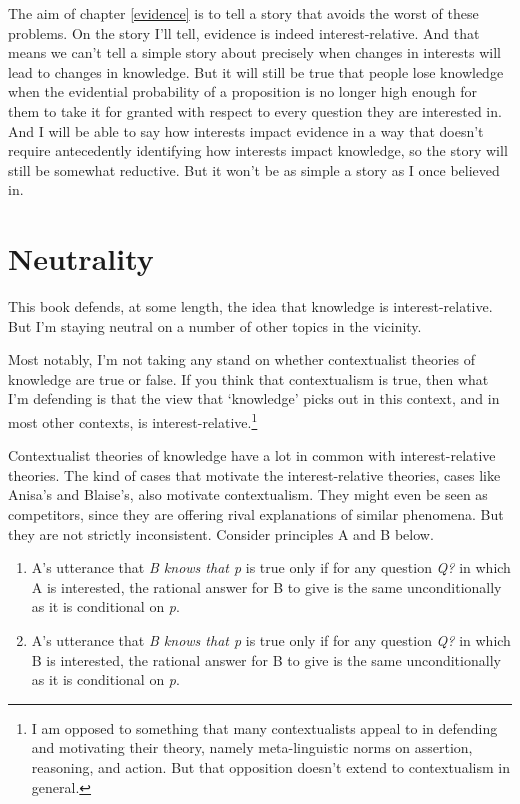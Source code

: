 \documentclass[
  11pt,
]{book}
\providecommand{\tightlist}{%
  \setlength{\itemsep}{0pt}\setlength{\parskip}{0pt}}
\begin{document}
The aim of chapter \ref{evidence} is to tell a story that avoids the worst of these problems. On the story I'll tell, evidence is indeed interest-relative. And that means we can't tell a simple story about precisely when changes in interests will lead to changes in knowledge. But it will still be true that people lose knowledge when the evidential probability of a proposition is no longer high enough for them to take it for granted with respect to every question they are interested in. And I will be able to say how interests impact evidence in a way that doesn't require antecedently identifying how interests impact knowledge, so the story will still be somewhat reductive. But it won't be as simple a story as I once believed in.

\hypertarget{neutrality}{%
\section{Neutrality}\label{neutrality}}

This book defends, at some length, the idea that knowledge is interest-relative. But I'm staying neutral on a number of other topics in the vicinity.

Most notably, I'm not taking any stand on whether contextualist theories of knowledge are true or false. If you think that contextualism is true, then what I'm defending is that the view that `knowledge' picks out in this context, and in most other contexts, is interest-relative.\footnote{I am opposed to something that many contextualists appeal to in defending and motivating their theory, namely meta-linguistic norms on assertion, reasoning, and action. But that opposition doesn't extend to contextualism in general.}

Contextualist theories of knowledge have a lot in common with interest-relative theories. The kind of cases that motivate the interest-relative theories, cases like Anisa's and Blaise's, also motivate contextualism. They might even be seen as competitors, since they are offering rival explanations of similar phenomena. But they are not strictly inconsistent. Consider principles A and B below.

\begin{enumerate}
\def\labelenumi{\Alph{enumi}.}
\tightlist
\item
  A's utterance that \emph{B knows that p} is true only if for any question \emph{Q?} in which A is interested, the rational answer for B to give is the same unconditionally as it is conditional on \emph{p}.
\item
  A's utterance that \emph{B knows that p} is true only if for any question \emph{Q?} in which B is interested, the rational answer for B to give is the same unconditionally as it is conditional on \emph{p}.
\end{enumerate}
\end{document}
